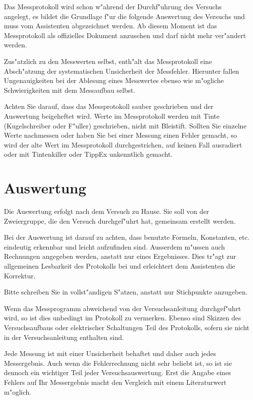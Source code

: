 Das Messprotokoll wird schon w"ahrend der Durchf"uhrung des Versuchs angelegt, es bildet die Grundlage f"ur die folgende Auswertung des Versuchs und muss vom Assistenten abgezeichnet werden. Ab diesem Moment ist das Messprotokoll als offizielles Dokument anzusehen und darf nicht mehr ver"andert werden.

Zus"atzlich zu den Messwerten selbst, enth"alt das Messprotokoll eine Absch"atzung der systematischen Unsicherheit der Messfehler. Hierunter fallen Ungenauigkeiten bei der Ablesung eines Messwertes ebenso wie m"ogliche Schwierigkeiten mit dem Messaufbau selbst.

Achten Sie darauf, dass das Messprotokoll sauber geschrieben und der Auswertung beigeheftet wird. Werte im Messprotokoll werden mit Tinte (Kugelschreiber oder F"uller) geschrieben, nicht mit Bleistift. Sollten Sie einzelne Werte nachmessen oder haben Sie bei einer Messung einen Fehler gemacht, so wird der alte Wert im Messprotokoll durchgestrichen, auf keinen Fall ausradiert oder mit Tintenkiller oder TippEx unkenntlich gemacht.

\section{Auswertung}

Die Auswertung erfolgt nach dem Versuch zu Hause. Sie soll von der Zweiergruppe, die den Versuch durchgef"uhrt hat, gemeinsam erstellt werden.

Bei der Auswertung ist darauf zu achten, dass benutzte Formeln, Konstanten, etc. eindeutig erkennbar und leicht aufzufinden sind. Ausserdem m"ussen auch Rechnungen angegeben werden, anstatt nur eines Ergebnisses. Dies tr"agt zur allgemeinen Lesbarkeit des Protokolls bei und erleichtert dem Assistenten die Korrektur.

Bitte schreiben Sie in vollst"andigen S"atzen, anstatt nur Stichpunkte anzugeben. 

Wenn das Messprogramm abweichend von der Versuchsanleitung durchgef"uhrt wird, so ist dies unbedingt im Protokoll zu vermerken. Ebenso sind Skizzen des Versuchsaufbaus oder elektrischer Schaltungen Teil des Protokolls, sofern sie nicht in der Versuchsanleitung enthalten sind.

\begin{important}
	Jede Messung ist mit einer Unsicherheit behaftet und daher auch jedes Messergebnis. Auch wenn die Fehlerrechnung nicht sehr beliebt ist, so ist sie dennoch ein wichtiger Teil jeder Versuchsauswertung. Erst die Angabe eines 	Fehlers auf Ihr Messergebnis macht den Vergleich mit einem Literaturwert m"oglich.
\end{important}

